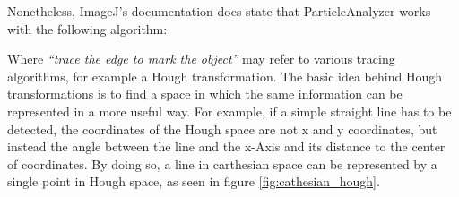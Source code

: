 \documentclass[a4paper, 12pt, twoside]{article}
\begin{document}
Nonetheless, ImageJ's documentation does state that ParticleAnalyzer works with
the following algorithm:

\begin{center}
\noindent{}
\end{center}

Where \textit{``trace the edge to mark the object''} may refer to various
tracing algorithms, for example a Hough transformation. The basic idea behind
Hough transformations is to find a space in which the same information can be
represented in a more useful way. For example, if a simple straight line has to
be detected, the coordinates of the Hough space are not x and y coordinates, but
instead the angle between the line and the x-Axis and its distance to the
center of coordinates. By doing so, a line in carthesian space can be
represented by a single point in Hough space, as seen in figure 
\ref{fig:cathesian_hough}.
\end{document}
